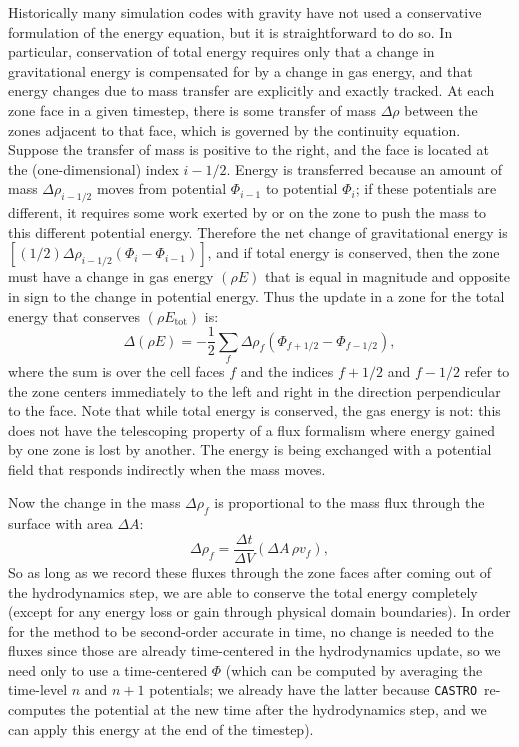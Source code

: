 \documentclass[iop]{../emulateapj}
\newcommand{\castro}{\texttt{CASTRO}}
\begin{document}
Historically many simulation codes with gravity have not used a conservative formulation 
of the energy equation, but it is straightforward to do so. In particular, conservation of 
total energy requires only that a change in gravitational energy is compensated for by a 
change in gas energy, and that energy changes due to mass transfer are explicitly and 
exactly tracked. At each zone face in a given timestep, there is some transfer of mass $\Delta \rho$ between 
the zones adjacent to that face, which is governed by the continuity equation. Suppose the 
transfer of mass is positive to the right, and the face is located at the (one-dimensional)
index $i-1/2$. Energy is transferred because an amount of mass $\Delta \rho_{i-1/2}$ moves from 
potential $\Phi_{i-1}$ to potential $\Phi_{i}$; if these potentials are different, it requires some 
work exerted by or on the zone to push the mass to this different potential energy. Therefore 
the net change of gravitational energy is $\left[(1/2)\Delta \rho_{i-1/2} (\Phi_{i} - \Phi_{i-1})\right]$,
and if total energy is conserved, then the zone must have a change in gas energy 
$(\rho E)$ that is equal in magnitude and opposite in sign to the change in potential energy. 
Thus the update in a zone for the total energy that conserves $(\rho E_{\text{tot}})$ is:
\begin{equation}
  \Delta (\rho E) = -\frac{1}{2}\sum_{f} \Delta \rho_{f} (\Phi_{f+1/2} - \Phi_{f-1/2}),\label{eq:grav_energy_conservation_update}
\end{equation}
where the sum is over the cell faces $f$ and the indices $f+1/2$ and $f-1/2$ refer to 
the zone centers immediately to the left and right in the direction perpendicular to the face.
Note that while total energy is conserved, the gas energy is not: this does not have the 
telescoping property of a flux formalism where energy gained by one zone is lost by another. 
The energy is being exchanged with a potential field that responds indirectly when the mass moves.

Now the change in the mass $\Delta \rho_{f}$ is proportional to the mass flux through the surface with area $\Delta A$:
\begin{equation}
  \Delta \rho_f = \frac{\Delta t}{\Delta V} (\Delta A\, \rho v_{f}),\label{eq:mass_transfer}
\end{equation}
So as long as we record these fluxes through the zone faces after coming out of the hydrodynamics step, 
we are able to conserve the total energy completely (except for any energy loss or gain through 
physical domain boundaries). In order for the method to be second-order accurate in time, 
no change is needed to the fluxes since those are already time-centered 
in the hydrodynamics update, so we need only to use a time-centered $\Phi$ (which can be computed 
by averaging the time-level $n$ and $n+1$ potentials; we already have the latter because \castro\ 
re-computes the potential at the new time after the hydrodynamics step, and we can apply this energy 
at the end of the timestep).
\end{document}
